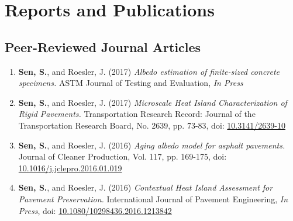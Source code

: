 \documentclass[12pt]{article}
\begin{document}
\section*{Reports and Publications}
\subsection*{Peer-Reviewed Journal Articles}
\begin{enumerate}[label=(J\arabic*)]
	\item \textbf{Sen, S.}, and Roesler, J. (2017) \textit{Albedo estimation of finite-sized concrete specimens.} ASTM Journal of Testing and Evaluation, \textit{In Press}
	\item \textbf{Sen, S.}, and Roesler, J. (2017) \textit{Microscale Heat Island Characterization of Rigid Pavements.} Transportation Research Record: Journal of the Transportation Research Board, No. 2639, pp. 73-83, doi: \href{http://dx.doi.org/10.3141/2639-10}{10.3141/2639-10}
	\item \textbf{Sen, S.}, and Roesler, J. (2016) \textit{Aging albedo model for asphalt pavements.} Journal of Cleaner Production, Vol. 117, pp. 169-175, doi: \href{http://dx.doi.org/10.1016/j.jclepro.2016.01.019}{10.1016/j.jclepro.2016.01.019}
	\item \textbf{Sen, S.}, and Roesler, J. (2016) \textit{Contextual Heat Island Assessment for Pavement Preservation.} International Journal of Pavement Engineering, \textit{In Press}, doi: \href{http://www.tandfonline.com/doi/full/10.1080/10298436.2016.1213842}{10.1080/10298436.2016.1213842}
\end{enumerate}
\end{document}
